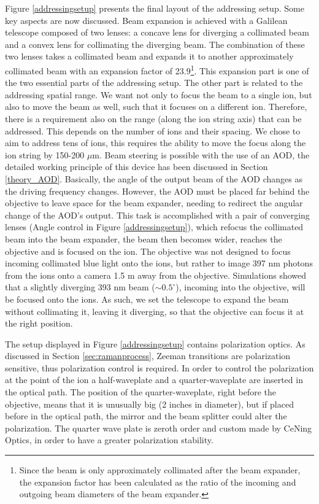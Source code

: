 Figure \ref{addressingsetup} presents the final layout of the addressing setup. Some key aspects are now discussed. Beam expansion is achieved with a Galilean telescope composed of two lenses: a concave lens for diverging a collimated beam and a convex lens for collimating the diverging beam. The combination of these two lenses takes a collimated beam and expands it to another approximately collimated beam with an expansion factor of 23.9\footnote{Since the beam is only approximately collimated after the beam expander, the expansion factor has been calculated as the ratio of the incoming and outgoing beam diameters of the beam expander.}. This expansion part is one of the two essential parts of the addressing setup. The other part is related to the addressing spatial range. We want not only to focus the beam to a single ion, but also to move the beam as well, such that it focuses on a different ion. Therefore, there is a requirement also on the range (along the ion string axis) that can be addressed. This depends on the number of ions and their spacing. We chose to aim to address tens of ions, this requires the ability to move the focus along the ion string by 150-200 $\mu$m. Beam steering is possible with the use of an AOD, the detailed working principle of this device has been discussed in Section \ref{theory_AOD}. Basically, the angle of the output beam of the AOD changes as the driving frequency changes. However, the AOD must be placed far behind the objective to leave space for the beam expander, needing to redirect the angular change of the AOD's output. This task is accomplished with a pair of converging lenses (Angle control in Figure \ref{addressingsetup}), which refocus the collimated beam into the beam expander, the beam then becomes wider, reaches the objective and is focused on the ion. The objective was not designed to focus incoming collimated blue light onto the ions, but rather to image 397 nm photons from the ions onto a camera 1.5 m away from the objective. Simulations showed that a slightly diverging 393 nm beam ($\sim 0.5^\circ$), incoming into the objective, will be focused onto the ions. As such, we set the telescope to expand the beam without collimating it, leaving it diverging, so that the objective can focus it at the right position.\par
The setup displayed in Figure \ref{addressingsetup} contains polarization optics. As discussed in Section \ref{sec:ramanprocess}, Zeeman transitions are polarization sensitive, thus polarization control is required. In order to control the polarization at the point of the ion a half-waveplate and a quarter-waveplate are inserted in the optical path. The position of the quarter-waveplate, right before the objective, means that it is unusually big (2 inches in diameter), but if placed before in the optical path, the mirror and the beam splitter could alter the polarization. The quarter wave plate is zeroth order and custom made by CeNing Optics, in order to have a greater polarization stability.\par
